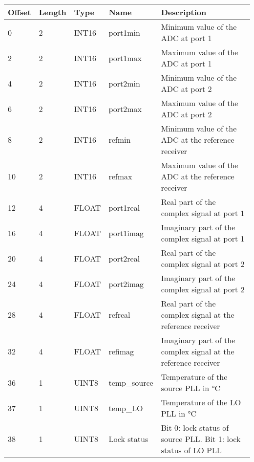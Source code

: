 \documentclass[a4paper,11pt]{article}
\begin{document}
\begin{ThreePartTable}
\setlength\tabcolsep{3pt}

\begin{longtable}{p{} |  p{}  |  p{}| p{} | p{}}
\toprule
\textbf{Offset} &\textbf{Length} &\textbf{Type} & \textbf{Name} &\textbf{Description} \\ 
\hline
\endhead
\midrule[\heavyrulewidth]
\endfoot  
\midrule[\heavyrulewidth]
\endlastfoot

0 & 2 & INT16 & port1min & Minimum value of the ADC at port 1 \\
2 & 2 & INT16 & port1max & Maximum value of the ADC at port 1 \\
4 & 2 & INT16 & port2min & Minimum value of the ADC at port 2 \\
6 & 2 & INT16 & port2max & Maximum value of the ADC at port 2 \\
8 & 2 & INT16 & refmin & Minimum value of the ADC at the reference receiver \\
10 & 2 & INT16 & refmax & Maximum value of the ADC at the reference receiver \\
12 & 4 & FLOAT & port1real & Real part of the complex signal at port 1 \\
16 & 4 & FLOAT & port1imag & Imaginary part of the complex signal at port 1 \\
20 & 4 & FLOAT & port2real & Real part of the complex signal at port 2 \\
24 & 4 & FLOAT & port2imag & Imaginary part of the complex signal at port 2 \\
28 & 4 & FLOAT & refreal & Real part of the complex signal at the reference receiver \\
32 & 4 & FLOAT & refimag & Imaginary part of the complex signal at the reference receiver \\
36 & 1 & UINT8 & temp\_source & Temperature of the source PLL in \si{\celsius} \\
37 & 1 & UINT8 & temp\_LO & Temperature of the LO PLL in \si{\celsius} \\
38 & 1 & UINT8 & Lock status & Bit 0: lock status of source PLL. Bit 1: lock status of LO PLL \\
\end{longtable}   
\end{ThreePartTable}
\end{document}
